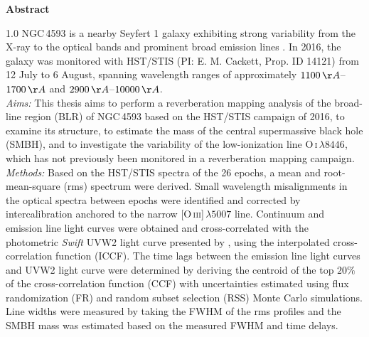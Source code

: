\documentclass[a4paper,12pt,twoside]{report}
\begin{document}
	\setcounter{page}{3}       %
	\pagestyle{fancy}
	\renewcommand{\chaptermark}[1]{\markboth{\thechapter.\ #1}{}}
	\renewcommand{\sectionmark}[1]{\markright{\thesection.\ #1}}
	\renewcommand{\cleardoublepage}{%
		\clearpage
		\ifodd\value{page}\else
		\thispagestyle{empty}%
		\hbox{}\newpage
		\fi
	}
\begin{center}
	{\Large\bfseries Abstract}
\end{center}
\vspace{0.5cm}
\begin{spacing}{1.0}
\noindent NGC\,4593 is a nearby Seyfert 1 galaxy exhibiting strong variability from the X-ray to the optical bands \parencite{mchardy2017ngc4593, cackett2018accretion} and prominent broad emission lines \parencite{kollatschny1997balmer, Ochmann_2025}. In 2016, the galaxy was monitored with HST/STIS (PI: E. M. Cackett, Prop. ID 14121) from 12 July to 6 August, spanning wavelength ranges of approximately $1100\,\AA$--$1700\,\AA$ and $2900\,\AA$--$10000\,\AA$. \\
\textit{Aims:} This thesis aims to perform a reverberation mapping analysis of the broad-line region (BLR) of NGC\,4593 based on the HST/STIS campaign of 2016, to examine its structure, to estimate the mass of the central supermassive black hole (SMBH), and to investigate the variability of the low-ionization line O\,\textsc{i}\,$\lambda 8446$, which has not previously been monitored in a reverberation mapping campaign.\\
\textit{Methods:} Based on the HST/STIS spectra of the 26 epochs, a mean and root-mean-square (rms) spectrum were derived. Small wavelength misalignments in the optical spectra between epochs were identified and corrected by intercalibration anchored to the narrow [O\,\textsc{iii}]\,$\lambda5007$ line. Continuum and emission line light curves were obtained and cross-correlated with the photometric \textit{Swift} UVW2 light curve presented by \cite{mchardy2018x}, using the interpolated cross-correlation function (ICCF). The time lags between the emission line light curves and UVW2 light curve were determined by deriving the centroid of the top $20\%$ of the cross-correlation function (CCF) with uncertainties estimated using flux randomization (FR) and random subset selection (RSS) Monte Carlo simulations. Line widths were measured by taking the FWHM of the rms profiles and the SMBH mass was estimated based on the measured FWHM and time delays.\\

\end{spacing}
\end{document}

